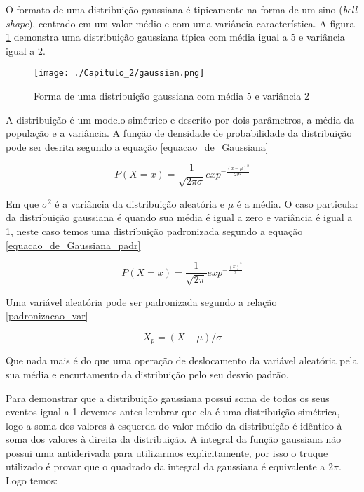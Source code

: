O formato de uma distribuição gaussiana é tipicamente na forma de um sino (\textit{bell shape}), centrado em um valor médio e com uma variância característica. A figura \ref{Fig_gaussian} demonstra uma distribuição gaussiana típica com média igual a 5 e variância igual a 2.

\FloatBarrier
\begin{figure}[!htb]
	\centering
	\texttt{[image: ./Capitulo\_2/gaussian.png]}	
	\caption{Forma de uma distribuição gaussiana com média 5 e variância 2}
	\label{Fig_gaussian}
\end{figure}
\FloatBarrier


A distribuição é um modelo simétrico e descrito por dois parâmetros, a média da população e a variância. A função de densidade de probabilidade da distribuição pode ser desrita segundo a equação \eqref{equacao_de_Gaussiana}


\begin{equation}\label{equacao_de_Gaussiana}
P(X = x) = \frac{1}{\sqrt{2\pi\sigma}}exp^{-\frac{(x-\mu)^2}{2\sigma^2}}
\end{equation}

Em que $\sigma^2$ é a variância da distribuição aleatória e $\mu$ é a média. O caso particular da distribuição gaussiana é quando sua média é igual a zero e variância é igual a 1, neste caso temos uma distribuição padronizada segundo a equação \eqref{equacao_de_Gaussiana_padr}

\begin{equation}\label{equacao_de_Gaussiana_padr}
P(X = x) = \frac{1}{\sqrt{2\pi}}exp^{-\frac{(x)^2}{2}}
\end{equation}

Uma variável aleatória pode ser padronizada segundo a relação \eqref{padronizacao_var}

\begin{equation}\label{padronizacao_var}
X_{p} = (X-\mu)/\sigma
\end{equation}

Que nada mais é do que uma operação de deslocamento da variável aleatória pela sua média e encurtamento da distribuição pelo seu desvio padrão.

Para demonstrar que a distribuição gaussiana possui soma de todos os seus eventos igual a 1 devemos antes lembrar que ela é uma distribuição simétrica, logo a soma dos valores à esquerda do valor médio da distribuição é idêntico à soma dos valores à direita da distribuição. A integral da função gaussiana não possui uma antiderivada para utilizarmos explicitamente, por isso o truque utilizado é provar que o quadrado da integral da gaussiana é equivalente a $2\pi$. Logo temos:


